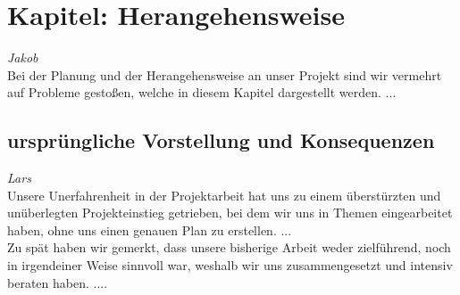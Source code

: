 \documentclass[12pt,a4paper,bibliography=totocnumbered,listof=totocnumbered]{scrartcl}
\begin{document}

\renewcommand{\sectionmark}[1]{\markright{#1}}
\renewcommand{\subsectionmark}[1]{}
\renewcommand{\subsubsectionmark}[1]{}
\rhead{\rightmark}

\onehalfspacing
\renewcommand{\thesection}{\arabic{section}}
\renewcommand{\theHsection}{\arabic{section}}
\setcounter{section}{0}
\setcounter{page}{1}

\section{Kapitel: Herangehensweise}
\emph{Jakob}\\
Bei der Planung und der Herangehensweise an unser Projekt sind wir vermehrt auf Probleme gestoßen, welche in diesem Kapitel dargestellt werden.
...

\subsection{ursprüngliche Vorstellung und Konsequenzen}
\emph{Lars}\\
Unsere Unerfahrenheit in der Projektarbeit hat uns zu einem überstürzten und unüberlegten Projekteinstieg getrieben, bei dem wir uns in Themen eingearbeitet haben, ohne uns einen genauen Plan zu erstellen.
...\\
Zu spät haben wir gemerkt, dass unsere bisherige Arbeit weder zielführend, noch in irgendeiner Weise sinnvoll war, weshalb wir uns zusammengesetzt und intensiv beraten haben.
....
\end{document}
